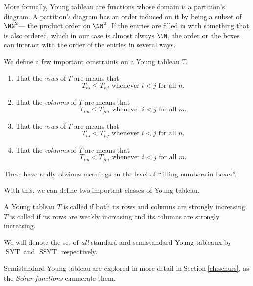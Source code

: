 \documentclass{article}
\DeclareMathOperator{\SYT}{SYT}
\DeclareMathOperator{\SSYT}{SSYT}
\begin{document}
More formally, Young tableau are functions whose domain is a partition's diagram.
A partition's diagram has an order induced on it by being a subset of $\NN^2$--- the product order on $\NN^2$.
If the entries are filled in with something that is also ordered, which in our case is almost always $\NN$, the order on the boxes can interact with the order of the entries in several ways.

\begin{definition}
    We define a few important constraints on a Young tableau $T$.
    \begin{enumerate}[label=(\alph*)]
        \item That the \textit{rows} of $T$ are  means that
            \[
                T_{ni} \leq T_{nj} \text{ whenever } i < j \text{ for all }n.
            \]
        \item That the \textit{columns} of $T$ are  means that
            \[
                T_{im} \leq T_{jm} \text{ whenever } i < j \text{ for all }m.
            \]
        \item That the \textit{rows} of $T$ are  means that
            \[
                T_{ni} < T_{nj} \text{ whenever } i < j \text{ for all }n.
            \]
        \item That the \textit{columns} of $T$ are  means that
            \[
                T_{im} < T_{jm} \text{ whenever } i < j \text{ for all }m.
            \]
    \end{enumerate}
\end{definition} 

These have really obvious meanings on the level of ``filling numbers in boxes''.

With this, we can define two important classes of Young tableau.

\begin{definition}
    A Young tableau $T$ is called  if both its rows and columns are strongly increasing. $T$ is called  if its rows are weakly increasing and its columns are strongly increasing.

    We will denote the set of \textit{all} standard and semistandard Young tableaux by $\SYT$ and $\SSYT$ respectively.
\end{definition}

Semistandard Young tableau are explored in more detail in Section \ref{ch:schurs}, as the \textit{Schur functions} enumerate them.
\end{document}
